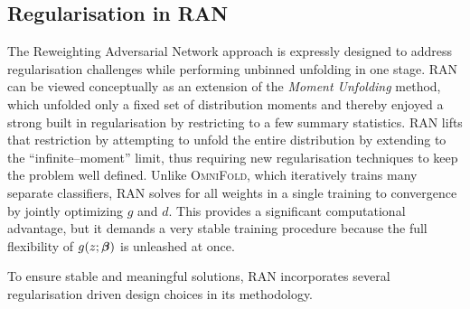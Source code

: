 {{    \subsection{Regularisation in RAN}
    \label{subsec:regularisation-in-ran}
        The Reweighting Adversarial Network approach is expressly designed to address regularisation challenges while performing unbinned unfolding in one stage.
        RAN can be viewed conceptually as an extension of the \emph{Moment Unfolding} method, which unfolded only a fixed set of distribution moments and thereby enjoyed a strong built in regularisation by restricting to a few summary statistics.
        RAN lifts that restriction by attempting to unfold the entire distribution by extending to the ``infinite--moment'' limit, thus requiring new regularisation techniques to keep the problem well defined.
        Unlike \textsc{OmniFold}, which iteratively trains many separate classifiers, RAN solves for all weights in a single training to convergence by jointly optimizing $g$ and $d$.
        This provides a significant computational advantage, but it demands a very stable training procedure because the full flexibility of $g(z; \vb*\beta)$ is unleashed at once.

        To ensure stable and meaningful solutions, RAN incorporates several regularisation driven design choices in its methodology.
}}
